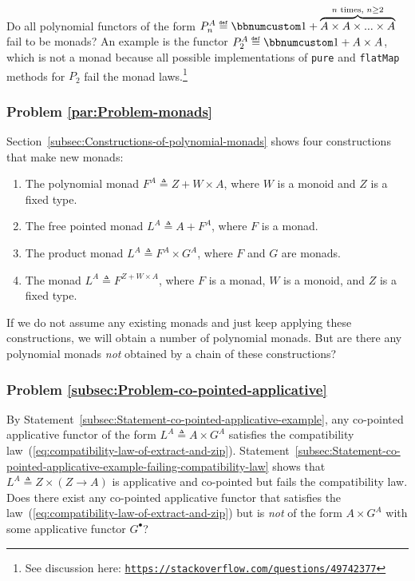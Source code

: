 Do all polynomial functors of the form $P_{n}^{A}\triangleq\bbnum 1+\overbrace{A\times A\times...\times A}^{n\text{ times, }n\ge2}$
fail to be monads? An example is the functor $P_{2}^{A}\triangleq\bbnum 1+A\times A$,
which is not a monad because all possible implementations of \lstinline!pure!
and \lstinline!flatMap! methods for $P_{2}$ fail the monad laws.\footnote{See discussion here: \texttt{\href{https://stackoverflow.com/questions/49742377}{https://stackoverflow.com/questions/49742377}}}

\subsubsection{Problem \label{par:Problem-monads}\ref{par:Problem-monads}}

Section~\ref{subsec:Constructions-of-polynomial-monads} shows four
constructions that make new monads:
\begin{enumerate}
\item The polynomial monad $F^{A}\triangleq Z+W\times A$, where $W$ is
a monoid and $Z$ is a fixed type.
\item The free pointed monad $L^{A}\triangleq A+F^{A}$, where $F$ is a
monad.
\item The product monad $L^{A}\triangleq F^{A}\times G^{A}$, where $F$
and $G$ are monads.
\item The monad $L^{A}\triangleq F^{Z+W\times A}$, where $F$ is a monad,
$W$ is a monoid, and $Z$ is a fixed type.
\end{enumerate}
If we do not assume any existing monads and just keep applying these
constructions, we will obtain a number of polynomial monads. But are
there any polynomial monads \emph{not} obtained by a chain of these
constructions?

\subsubsection{Problem \label{subsec:Problem-co-pointed-applicative}\ref{subsec:Problem-co-pointed-applicative}}

By Statement~\ref{subsec:Statement-co-pointed-applicative-example},
any co-pointed applicative functor of the form $L^{A}\triangleq A\times G^{A}$
satisfies the compatibility law~(\ref{eq:compatibility-law-of-extract-and-zip}).
Statement~\ref{subsec:Statement-co-pointed-applicative-example-failing-compatibility-law}
shows that $L^{A}\triangleq Z\times\left(Z\rightarrow A\right)$ is
applicative and co-pointed but fails the compatibility law. Does there
exist any co-pointed applicative functor that satisfies the law~(\ref{eq:compatibility-law-of-extract-and-zip})
but is \emph{not} of the form $A\times G^{A}$ with some applicative
functor $G^{\bullet}$? 

